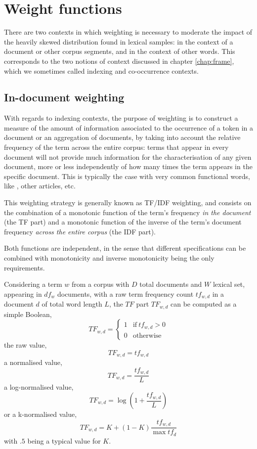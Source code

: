 \chapter{Weight functions}
\label{app:weighting}

There are two contexts in which weighting is necessary to moderate the impact of the heavily skewed distribution found in lexical samples: in the context of a document or other corpus segments, and in the context of other words.
This corresponds to the two notions of context discussed in chapter \ref{chap:frame}, which we sometimes called indexing and co-occurrence contexts.

\section{In-document weighting}

With regards to indexing contexts, the purpose of weighting is to construct a measure of the amount of information associated to the occurrence of a token in a document or an aggregation of documents, by taking into account the relative frequency of the term across the entire corpus: terms that appear in every document will not provide much information for the characterisation of any given document, more or less independently of how many times the term appears in the specific document.
This is typically the case with very common functional words, like , other articles, etc.

This weighting strategy is generally known as TF/IDF weighting, and consists on the combination of a monotonic function of the term's frequency \emph{in the document} (the TF part) and a monotonic function of the inverse of the term's document frequency \emph{across the entire corpus} (the IDF part).

Both functions are independent, in the sense that different specifications can be combined with monotonicity and inverse monotonicity being the only requirements.

Considering a term $w$ from a corpus with $D$ total documents and $W$ lexical set, appearing in $df_{w}$ documents, with a raw term frequency count $tf_{w,d}$ in a document $d$ of total word length $L$, the $TF$ part $TF_{w,d}$ can be computed as a simple Boolean,
    $$
    TF_{w,d} = \begin{cases}
        1 & \text{if}\ tf_{w,d} > 0\\
        0 & \text{otherwise}
    \end{cases}
    $$
the raw value,
    $$ TF_{w,d} = tf_{w,d} $$
a normalised value,
    $$ TF_{w,d} = \frac{tf_{w,d}}{L} $$
a log-normalised value,
    $$ TF_{w,d} = \log \left( 1 + \frac{tf_{w,d}}{L} \right)$$
or a k-normalised value,
    $$ TF_{w,d} = K + ( 1 - K ) \frac{tf_{w,d}}{\max tf_{d}} $$
with $.5$ being a typical value for $K$.

